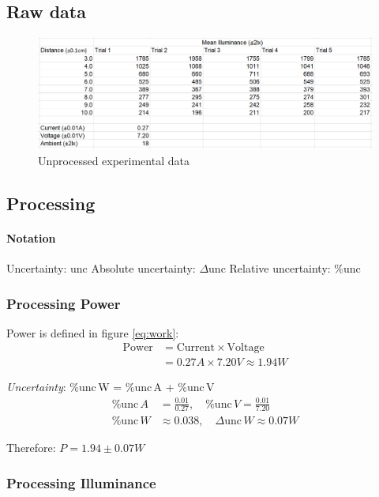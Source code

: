 \documentclass[a4paper,12pt]{article}
\newcommand{\absun}{\Delta \text{unc}\,}
\newcommand{\relun}{\% \text{unc}\,}
\begin{document}
\subsection{Raw data}
\begin{figure}[h!]
    \centering
    \includegraphics[width=\textwidth]{assets/rawdata.png}
    \caption{Unprocessed experimental data}
    \label{fig:raw}
\end{figure}

\subsection{Processing}
\paragraph{Notation}

Uncertainty: unc \quad Absolute uncertainty: $\Delta$unc \quad Relative uncertainty: \%unc


\subsubsection{Processing Power}
Power is defined in figure \ref{eq:work}:
\begin{align*}
\text{Power} &= \text{Current} \times \text{Voltage}\\
        &= 0.27\si{A} \times 7.20\si{V} \approx 1.94 \si{W}
\end{align*}

\textit{Uncertainty}: $\relun$W =  $\relun$A +  $\relun$V
\begin{align*}
    \relun \si{A} &= \frac{0.01}{0.27},\quad \relun \si{V} = \frac{0.01}{7.20}\\
    \relun \si{W} &\approx 0.038,\quad \absun \si{W} \approx 0.07\si{W}
\end{align*}

Therefore: $P = 1.94 \pm 0.07 \si{W}$

\subsubsection{Processing Illuminance}
\end{document}
